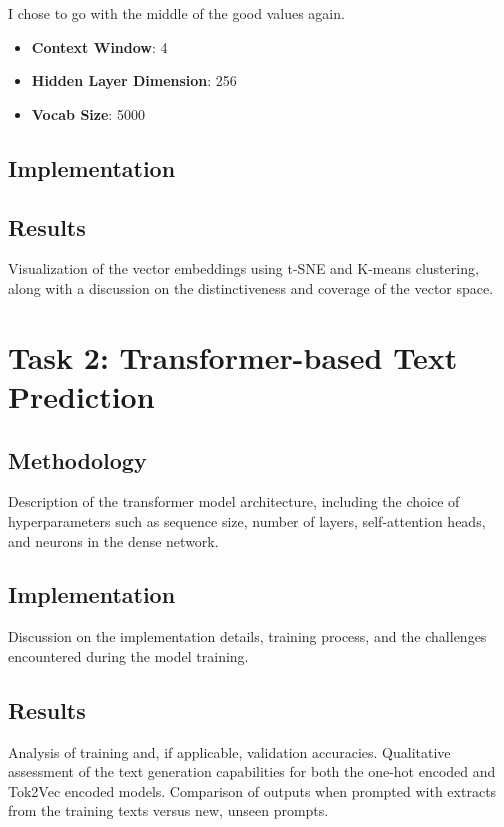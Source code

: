 \documentclass[12pt]{article} \usepackage{COSC420style} \usepackage{soul}
\begin{document}
I chose to go with the middle of the good values again.

\begin{itemize}
	\item \textbf{Context Window}: 4
	\item \textbf{Hidden Layer Dimension}: 256
	\item \textbf{Vocab Size}: 5000
\end{itemize}

\subsection{Implementation}

\subsection{Results}

Visualization of the vector embeddings using t-SNE and K-means clustering, along with a discussion
on the distinctiveness and coverage of the vector space.

\section{Task 2: Transformer-based Text Prediction}

\subsection{Methodology}

Description of the transformer model architecture, including the choice of hyperparameters such as
sequence size, number of layers, self-attention heads, and neurons in the dense network.

\subsection{Implementation}

Discussion on the implementation details, training process, and the challenges encountered during
the model training.

\subsection{Results}

Analysis of training and, if applicable, validation accuracies. Qualitative assessment of the text
generation capabilities for both the one-hot encoded and Tok2Vec encoded models. Comparison of
outputs when prompted with extracts from the training texts versus new, unseen prompts.
\end{document}
